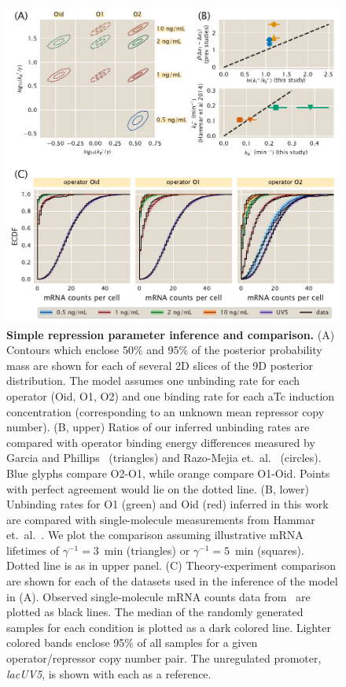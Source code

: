 \begin{figure}%
\centering
\includegraphics[width=\textwidth]{../../figures/main/fig04.pdf}
\caption{\textbf{Simple repression parameter inference and comparison.}
(A) Contours which enclose 50\% and 95\% of the posterior probability mass are
shown for each of several 2D slices of the 9D posterior distribution. The model
assumes one unbinding rate for each operator (Oid, O1, O2) and one binding rate
for each aTc induction concentration (corresponding to an unknown mean repressor
copy number). (B, upper) Ratios of our inferred unbinding rates are compared
with operator binding energy differences measured by Garcia and
Phillips~\cite{Garcia2011a} (triangles) and Razo-Mejia et.\
al.~\cite{Razo-Mejia2018} (circles). Blue glyphs compare O2-O1, while orange
compare O1-Oid. Points with perfect agreement would lie on the dotted line. (B,
lower) Unbinding rates for O1 (green) and Oid (red) inferred in this work are
compared with single-molecule measurements from Hammar et.\
al.~\cite{Hammar2014}. We plot the comparison assuming illustrative mRNA
lifetimes of $\gamma^{-1}=3$~min (triangles) or $\gamma^{-1}=5$~min (squares).
Dotted line is as in upper panel. (C) Theory-experiment comparison are shown for
each of the datasets used in the inference of the model in (A). Observed
single-molecule mRNA counts data from~\cite{Jones2014} are plotted as black
lines. The median of the randomly generated samples for each condition is
plotted as a dark colored line. Lighter colored bands enclose 95\% of all
samples for a given operator/repressor copy number pair. The unregulated
promoter, \textit{lacUV5}, is shown with each as a reference.}
\label{fig4:repressed_post_full}
\end{figure}

